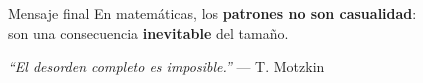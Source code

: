 \begin{frame}

    \vspace{1.5cm}

    \begin{alertblock}{\centering Mensaje final}
        \centering\Large
        En matemáticas, los \textbf{patrones no son casualidad}:\\[6pt]
        son una consecuencia \textbf{inevitable} del tamaño.
    \end{alertblock}

    \vspace{0.8cm}

    \begin{center}
        \textit{``El desorden completo es imposible.''} — T. Motzkin
    \end{center}

\end{frame}
